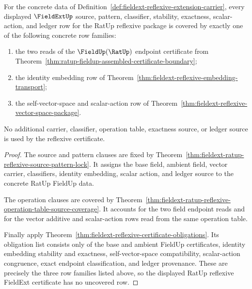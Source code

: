 \begin{theorem}
\label{thm:fieldext-ratup-reflexive-certificate-row-exhaustion}
For the concrete data of
Definition~\ref{def:fieldext-reflexive-extension-carrier}, every displayed
$\FieldExtUp$ source, pattern, classifier, stability, exactness,
scalar-action, and ledger row for the RatUp reflexive package is covered by
exactly one of the following concrete row families:
\begin{enumerate}
  \item the two reads of the $\FieldUp(\RatUp)$ endpoint certificate from
  Theorem~\ref{thm:ratup-fieldup-assembled-certificate-boundary};
  \item the identity embedding row of
  Theorem~\ref{thm:fieldext-reflexive-embedding-transport};
  \item the self-vector-space and scalar-action row of
  Theorem~\ref{thm:fieldext-reflexive-vector-space-package}.
\end{enumerate}
No additional carrier, classifier, operation table, exactness source, or
ledger source is used by the reflexive certificate.
\end{theorem}
\begin{proof}
The source and pattern clauses are fixed by
Theorem~\ref{thm:fieldext-ratup-reflexive-source-pattern-lock}. It assigns the
base field, ambient field, vector carrier, classifiers, identity embedding,
scalar action, and ledger source to the concrete RatUp FieldUp data.

The operation clauses are covered by
Theorem~\ref{thm:fieldext-ratup-reflexive-operation-table-source-coverage}. It
accounts for the two field endpoint reads and for the vector additive and
scalar-action rows read from the same operation table.

Finally apply
Theorem~\ref{thm:fieldext-reflexive-certificate-obligations}. Its obligation
list consists only of the base and ambient FieldUp certificates, identity
embedding stability and exactness, self-vector-space compatibility,
scalar-action congruence, exact endpoint classification, and ledger
provenance. These are precisely the three row families listed above, so the
displayed RatUp reflexive FieldExt certificate has no uncovered row.
\end{proof}

